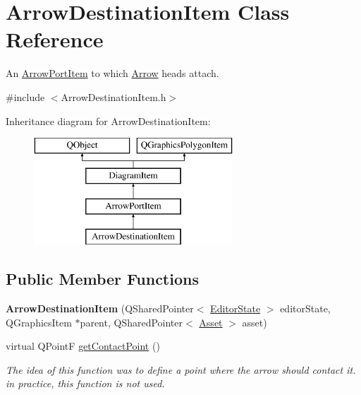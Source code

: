 \hypertarget{class_arrow_destination_item}{\section{Arrow\-Destination\-Item Class Reference}
\label{class_arrow_destination_item}
}


An \hyperlink{class_arrow_port_item}{Arrow\-Port\-Item} to which \hyperlink{class_arrow}{Arrow} heads attach.  




{\ttfamily \#include $<$Arrow\-Destination\-Item.\-h$>$}

Inheritance diagram for Arrow\-Destination\-Item\-:\begin{figure}[H]
\begin{center}
\leavevmode
\includegraphics[height=4.000000cm]{class_arrow_destination_item}
\end{center}
\end{figure}
\subsection*{Public Member Functions}
\begin{DoxyCompactItemize}
\item 
\hypertarget{class_arrow_destination_item_ac65344e8848ee5daa4149df7bac47c5a}{{\bfseries Arrow\-Destination\-Item} (Q\-Shared\-Pointer$<$ \hyperlink{class_editor_state}{Editor\-State} $>$ editor\-State, Q\-Graphics\-Item $\ast$parent, Q\-Shared\-Pointer$<$ \hyperlink{class_picto_1_1_asset}{Asset} $>$ asset)}\label{class_arrow_destination_item_ac65344e8848ee5daa4149df7bac47c5a}

\item 
\hypertarget{class_arrow_destination_item_aaa57aba4edc100e70fbbad33cdb96590}{virtual Q\-Point\-F \hyperlink{class_arrow_destination_item_aaa57aba4edc100e70fbbad33cdb96590}{get\-Contact\-Point} ()}\label{class_arrow_destination_item_aaa57aba4edc100e70fbbad33cdb96590}

\begin{DoxyCompactList}\small\item\em The idea of this function was to define a point where the arrow should contact it. in practice, this function is not used. \end{DoxyCompactList}\end{DoxyCompactItemize}
